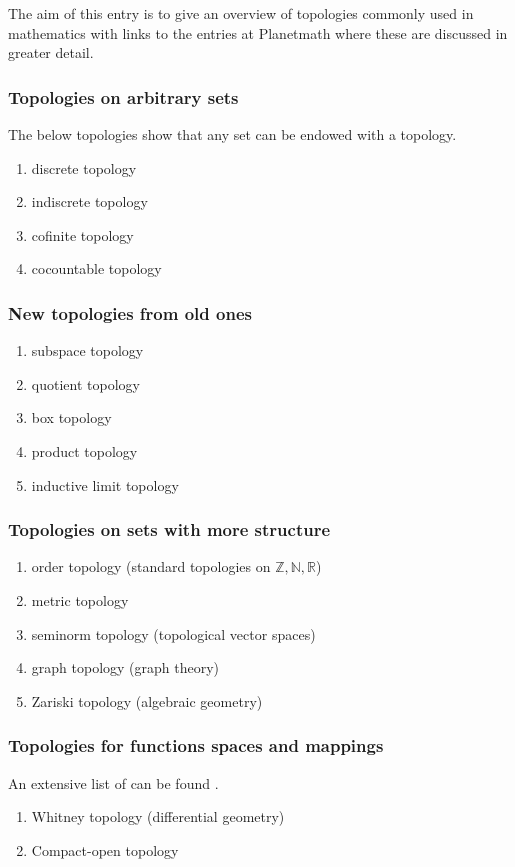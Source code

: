 \documentclass[12pt]{article}
\newcommand{\sR}[0]{\mathbb{R}}
\newcommand{\sN}[0]{\mathbb{N}}
\newcommand{\sZ}[0]{\mathbb{Z}}
\begin{document}
The aim of this entry is to give an overview of topologies
commonly used in mathematics with links to the
entries at Planetmath where these are discussed in greater detail. 

\subsubsection*{Topologies on arbitrary sets}
The below topologies show that any set can be endowed with a topology. 
\begin{enumerate}
\item discrete topology
\item indiscrete topology
\item cofinite topology
\item cocountable topology
\end{enumerate}

\subsubsection*{New topologies from old ones}
\begin{enumerate}
\item subspace topology
\item quotient topology
\item box topology
\item product topology
\item inductive limit topology
\end{enumerate}

\subsubsection*{Topologies on sets with more structure}
\begin{enumerate}
\item order topology (standard topologies on $\sZ, \sN, \sR$)
\item metric topology
\item seminorm topology (topological vector spaces)
\item graph topology (graph theory)
\item Zariski topology (algebraic geometry)
\end{enumerate}

\subsubsection*{Topologies for functions spaces and mappings}
An extensive list of  can be 
found .
\begin{enumerate}
\item Whitney topology (differential geometry)
\item Compact-open topology
\end{enumerate}
\end{document}
